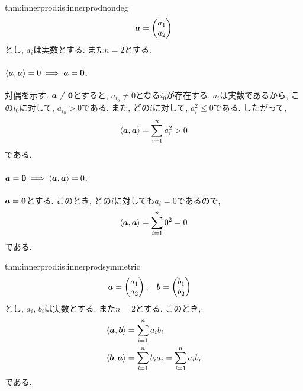 \begin{proofof*}{thm:innerprod:is:innerprod}{nondeg}
  \begin{align*}
        \boldsymbol{a}=\begin{pmatrix}a_1\\a_2\end{pmatrix}
  \end{align*}
  とし,   $a_i$は実数とする.
  また$n=2$とする.

  \paragraph{$\langle{\boldsymbol{a}},{\boldsymbol{a}}\rangle=0 \implies \boldsymbol{a}=\boldsymbol{0}$.}
  対偶を示す.
  $\boldsymbol{a}\neq \boldsymbol{0}$とすると,
  $a_{i_0}\neq 0$となる$i_0$が存在する.
  $a_i$は実数であるから,
  この$i_0$に対して,
  $a_{i_0}>0$である.
  また, どの$i$に対して, $a_i^2\leq 0$である.
  したがって,
  \begin{align*}
    \Braket{\boldsymbol{a},\boldsymbol{a}}=\sum_{i=1}^n a_i^2>0
  \end{align*}
  である.


  \paragraph{$\boldsymbol{a}=\boldsymbol{0}\implies \langle\boldsymbol{a},\boldsymbol{a}\rangle=0$.}
  $\boldsymbol{a}=\boldsymbol{0}$とする. このとき, どの$i$に対しても$a_i=0$であるので,
  \begin{align*}
    \Braket{\boldsymbol{a},\boldsymbol{a}}=\sum_{i=1}^n 0^2=0
  \end{align*}
  である.
  
\end{proofof*}

\begin{proofof*}{thm:innerprod:is:innerprod}{symmetric}
  \begin{align*}
    \boldsymbol{a}&=\begin{pmatrix}a_1\\a_2\end{pmatrix},&
    \boldsymbol{b}&=\begin{pmatrix}b_1\\b_2\end{pmatrix}
  \end{align*}
  とし,   $a_i$, $b_i$は実数とする.
  また$n=2$とする.
  このとき, 
  \begin{align*}
    \Braket{\boldsymbol{a},\boldsymbol{b}}&=\sum_{i=1}^n a_ib_i\\
    \Braket{\boldsymbol{b},\boldsymbol{a}}&=\sum_{i=1}^n b_ia_i=\sum_{i=1}^n a_ib_i
  \end{align*}
  である.
\end{proofof*}

